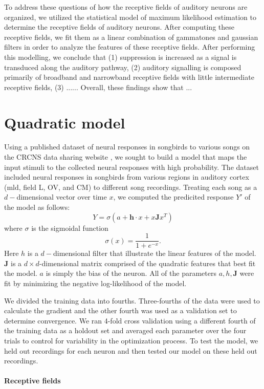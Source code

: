 \documentclass{article}
\begin{document}
To address these questions of how the receptive fields of auditory neurons are organized, we utilized the statistical model of maximum likelihood estimation to determine the receptive fields of auditory neurons. After computing these receptive fields, we fit them as a linear combination of gammatones and gaussian filters in order to analyze the features of these receptive fields. After performing this modelling, we conclude that (1) suppression is increased as a signal is transduced along the auditory pathway, (2) auditory signalling is composed primarily of broadband and narrowband receptive fields with little intermediate receptive fields, (3) ...... Overall, these findings show that ...

\section{Quadratic model}

Using a published dataset of neural responses in songbirds to various songs on the CRCNS data sharing website \cite{songbirddataset}, we sought to build a model that maps the input stimuli to the collected neural responses with high probability. The dataset included neural responses in songbirds from various regions in auditory cortex (mld, field L, OV, and CM) to different song recordings. Treating each song as a $d-$dimensional vector over time $x$, we computed the predicited response $Y'$ of the model as follows:
$$
Y = \sigma(a + \mathbf{h}\cdot x + x\mathbf{J}x^T)
$$ where $\sigma$ is the sigmoidal function
$$\sigma(x) = \frac{1}{1+e^{-x}}.$$ Here $h$ is a $d-$dimensional filter that illustrate the linear features of the model. $\mathbf{J}$ is a $d\times d$-dimensional matrix comprised of the quadratic features that best fit the model. $a$ is simply the bias of the neuron. All of the parameters $a, h, \mathbf{J}$ were fit by minimizing the negative log-likelihood of the model.

We divided the training data into fourths. Three-fourths of the data were used to calculate the gradient and the other fourth was used as a validation set to determine convergence. We ran 4-fold cross validation using a different fourth of the training data as a holdout set and averaged each parameter over the four trials to control for variability in the optimization process. To test the model, we held out recordings for each neuron and then tested our model on these held out recordings.

\paragraph{Receptive fields}
\end{document}

